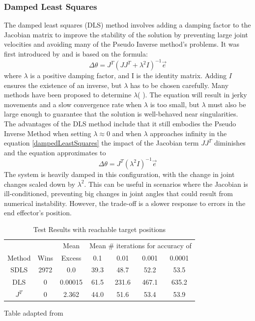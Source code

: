 \documentclass[conference]{IEEEtran}
\begin{document}
\subsubsection{Damped Least Squares}
The damped least squares (DLS) method involves adding a damping factor to the Jacobian matrix to improve the stability of the solution by preventing large joint velocities and avoiding many of the Pseudo Inverse method's problems. It was first introduced by \cite{wampler_manipulator_1986} and is based on the formula:
\begin{equation} \label{dampedLeastSquares}
\Delta\theta = J^T(JJ^T + \lambda^2I)^{-1}\vec{e}
\end{equation}
where $\lambda$ is a positive damping factor, and I is the identity matrix. Adding $I$ ensures the existence of an inverse, but $\lambda$ has to be chosen carefully. Many methods have been proposed to determine $\lambda$( \cite{deo_robot_1992}\cite{deo_adaptive_1993}\cite{maciejewski_singular_1989}\cite{chiaverini_review_1994}\cite{chung_torque_2000}\cite{chan_general_1988}\cite{mayorga_fast_1992}). The equation will result in jerky movements and a slow convergence rate when $\lambda$ is too small, but $\lambda$ must also be large enough to guarantee that the solution is well-behaved near singularities. The advantages of the DLS method include that it still embodies the Pseudo Inverse Method when setting $\lambda \approx 0$ and when $\lambda$ approaches infinity in the equation \eqref{dampedLeastSquares} the impact of the Jacobian term $JJ^T$ diminishes and the equation approximates to 
\begin{equation}
\Delta\theta = J^T(\lambda^2I)^{-1}\vec{e}
\end{equation}
The system is heavily damped in this configuration, with the change in joint changes scaled down by $\lambda^2$. This can be useful in scenarios where the Jacobian is ill-conditioned, preventing big changes in joint angles that could result from numerical instability. However, the trade-off is a slower response to errors in the end effector's position.
\begin{table}[htbp]
\centering
\begin{threeparttable}
\caption{Test Results with reachable target positions}
\label{tab:reachableTarget}
\begin{tabular}{c|cccccc}
 & & Mean & \multicolumn{4}{c}{Mean \# iterations for accuracy of} \\
Method & Wins & Excess & 0.1 & 0.01 & 0.001 & 0.0001 \\
\hline
SDLS   & 2972 & 0.0    & 39.3  & 48.7  & 52.2  & 53.5   \\
DLS    & 0    & 0.00015 & 61.5  & 231.6 & 467.1 & 635.2  \\
$J^T$  & 0    & 2.362   & 44.0  & 51.6  & 53.4  & 53.9   \\
\hline
\end{tabular}
\begin{tablenotes}\footnotesize
\centering
\item[] Table adapted from \cite{buss_selectively_2005}
\end{tablenotes}
\end{threeparttable}
\end{table}
\end{document}
